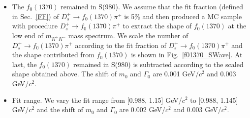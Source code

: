 {\begin{itemize}
        \item \uppercase\expandafter{} The $f_{0}(1370)$ remained in S(980). 
            We assume that the fit fraction (defined in Sec.~\ref{FF}) of $D_{s}^{+} \rightarrow f_{0}(1370)\pi^{+}$ is 5\% and then produced a MC sample with procedure $D_{s}^{+} \rightarrow f_{0}(1370)\pi^{+}$ to extract the shape of $f_{0}(1370)$ at the low end of $m_{K^{+}K^{-}}$ mass spectrum.
            We scale the number of $D_{s}^{+} \rightarrow f_{0}(1370)\pi^{+}$ according to the fit fraction of $D_{s}^{+} \rightarrow f_{0}(1370)\pi^{+}$ and the shape contributed from $f_{0}(1370)$ is shown in Fig.~\ref{f01370_SWave}.
            At last, the $f_{0}(1370)$ remained in S(980) is subtracted according to the scaled shape obtained above.
            The shift of $m_{0}$ and $\Gamma_{0}$ are 0.001 GeV/$c^{2}$ and 0.003 GeV/$c^{2}$.

        
        \item \uppercase\expandafter{} Fit range. We vary the fit range from [0.988, 1.15] GeV/$c^{2}$ to [0.988, 1.145] GeV/$c^{2}$ and the shift of $m_{0}$ and $\Gamma_{0}$ are 0.002 GeV/$c^{2}$ and 0.003 GeV/$c^{2}$.  

    \end{itemize}


}
